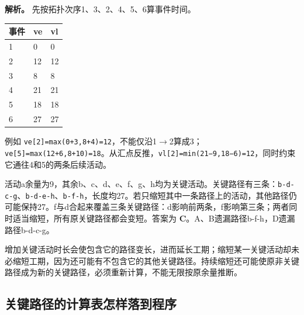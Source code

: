 \textbf{解析。} 先按拓扑次序1、3、2、4、5、6算事件时间。

\begin{wideblock}

\par\medskip\noindent\begin{minipage}{\linewidth}\fontsize{9.3}{12}\selectfont\begin{tabularx}{\linewidth}{@{}YYY@{}}
\toprule\noalign{}
事件 & ve & vl \\
\midrule\noalign{}


1 & 0 & 0 \\
2 & 12 & 12 \\
3 & 8 & 8 \\
4 & 21 & 21 \\
5 & 18 & 18 \\
6 & 27 & 27 \\
\bottomrule\end{tabularx}
\end{minipage}\par\medskip

\end{wideblock}

例如 \texttt{ve[\allowbreak{}2]\allowbreak{}=\allowbreak{}max(\allowbreak{}0+\allowbreak{}3,\allowbreak{}8+\allowbreak{}4)\allowbreak{}=\allowbreak{}12}，不能仅沿1\ensuremath{\to}2算成3；\texttt{ve[\allowbreak{}5]\allowbreak{}=\allowbreak{}max(\allowbreak{}12+\allowbreak{}6,\allowbreak{}8+\allowbreak{}10)\allowbreak{}=\allowbreak{}18}。从汇点反推，\texttt{vl[\allowbreak{}2]\allowbreak{}=\allowbreak{}min(\allowbreak{}21−9,\allowbreak{}18−6)\allowbreak{}=\allowbreak{}12}，同时约束它通往4和5的两条后续活动。

活动a余量为9，其余b、c、d、e、f、g、h均为关键活动。关键路径有三条：\texttt{b-d-c-g}、\texttt{b-d-e-h}、\texttt{b-f-h}，长度均27。若只缩短其中一条路径上的活动，其他路径仍可能保持27。f与d合起来覆盖三条关键路径：d影响前两条，f影响第三条；两者同时适当缩短，所有原关键路径都会变短。答案为 \textbf{C}。A、B遗漏路径b-f-h，D遗漏路径b-d-c-g。

增加关键活动时长会使包含它的路径变长，进而延长工期；缩短某一关键活动却未必缩短工期，因为还可能有不包含它的其他关键路径。持续缩短还可能使原非关键路径成为新的关键路径，必须重新计算，不能无限按原余量推断。

\subsection{关键路径的计算表怎样落到程序}\label{DS06-aoe-code}

